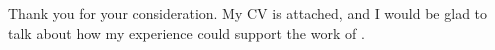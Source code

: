 
Thank you for your consideration. My CV is attached, and I would be glad to talk about how my experience could support the work of \theemployer.
